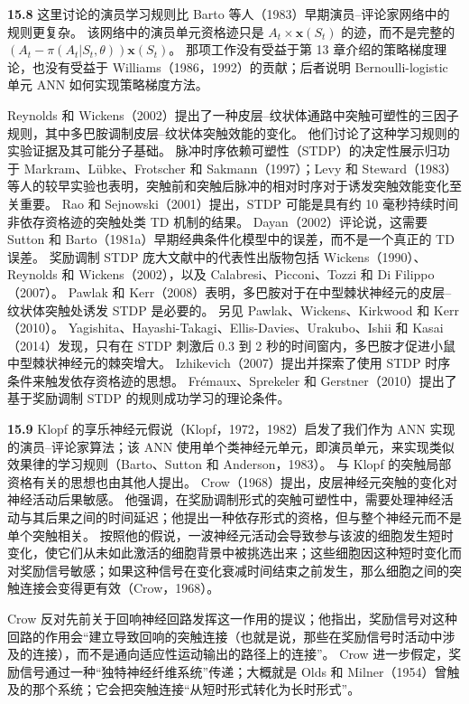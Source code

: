 \documentclass[UTF8,12pt,a4paper,fontset=fandol]{ctexart}
\begin{document}
\noindent\textbf{15.8}
这里讨论的演员学习规则比 Barto 等人（1983）早期演员--评论家网络中的规则更复杂。
该网络中的演员单元资格迹只是 $A_t\times\mathbf{x}(S_t)$ 的迹，而不是完整的 $(A_t-\pi(A_t|S_t,\theta))\mathbf{x}(S_t)$。
那项工作没有受益于第 13 章介绍的策略梯度理论，也没有受益于 Williams（1986，1992）的贡献；后者说明 Bernoulli-logistic 单元 ANN 如何实现策略梯度方法。

Reynolds 和 Wickens（2002）提出了一种皮层--纹状体通路中突触可塑性的三因子规则，其中多巴胺调制皮层--纹状体突触效能的变化。
他们讨论了这种学习规则的实验证据及其可能分子基础。
脉冲时序依赖可塑性（STDP）的决定性展示归功于 Markram、Lübke、Frotscher 和 Sakmann（1997）；Levy 和 Steward（1983）等人的较早实验也表明，突触前和突触后脉冲的相对时序对于诱发突触效能变化至关重要。
Rao 和 Sejnowski（2001）提出，STDP 可能是具有约 10 毫秒持续时间非依存资格迹的突触处类 TD 机制的结果。
Dayan（2002）评论说，这需要 Sutton 和 Barto（1981a）早期经典条件化模型中的误差，而不是一个真正的 TD 误差。
奖励调制 STDP 庞大文献中的代表性出版物包括 Wickens（1990）、Reynolds 和 Wickens（2002），以及 Calabresi、Picconi、Tozzi 和 Di Filippo（2007）。
Pawlak 和 Kerr（2008）表明，多巴胺对于在中型棘状神经元的皮层--纹状体突触处诱发 STDP 是必要的。
另见 Pawlak、Wickens、Kirkwood 和 Kerr（2010）。
Yagishita、Hayashi-Takagi、Ellis-Davies、Urakubo、Ishii 和 Kasai（2014）发现，只有在 STDP 刺激后 0.3 到 2 秒的时间窗内，多巴胺才促进小鼠中型棘状神经元的棘突增大。
Izhikevich（2007）提出并探索了使用 STDP 时序条件来触发依存资格迹的思想。
Frémaux、Sprekeler 和 Gerstner（2010）提出了基于奖励调制 STDP 的规则成功学习的理论条件。

\noindent\textbf{15.9}
Klopf 的享乐神经元假说（Klopf，1972，1982）启发了我们作为 ANN 实现的演员--评论家算法；该 ANN 使用单个类神经元单元，即演员单元，来实现类似效果律的学习规则（Barto、Sutton 和 Anderson，1983）。
与 Klopf 的突触局部资格有关的思想也由其他人提出。
Crow（1968）提出，皮层神经元突触的变化对神经活动后果敏感。
他强调，在奖励调制形式的突触可塑性中，需要处理神经活动与其后果之间的时间延迟；他提出一种依存形式的资格，但与整个神经元而不是单个突触相关。
按照他的假说，一波神经元活动会导致参与该波的细胞发生短时变化，使它们从未如此激活的细胞背景中被挑选出来；这些细胞因这种短时变化而对奖励信号敏感；如果这种信号在变化衰减时间结束之前发生，那么细胞之间的突触连接会变得更有效（Crow，1968）。

Crow 反对先前关于回响神经回路发挥这一作用的提议；他指出，奖励信号对这种回路的作用会“建立导致回响的突触连接（也就是说，那些在奖励信号时活动中涉及的连接），而不是通向适应性运动输出的路径上的连接”。
Crow 进一步假定，奖励信号通过一种“独特神经纤维系统”传递；大概就是 Olds 和 Milner（1954）曾触及的那个系统；它会把突触连接“从短时形式转化为长时形式”。
\end{document}
